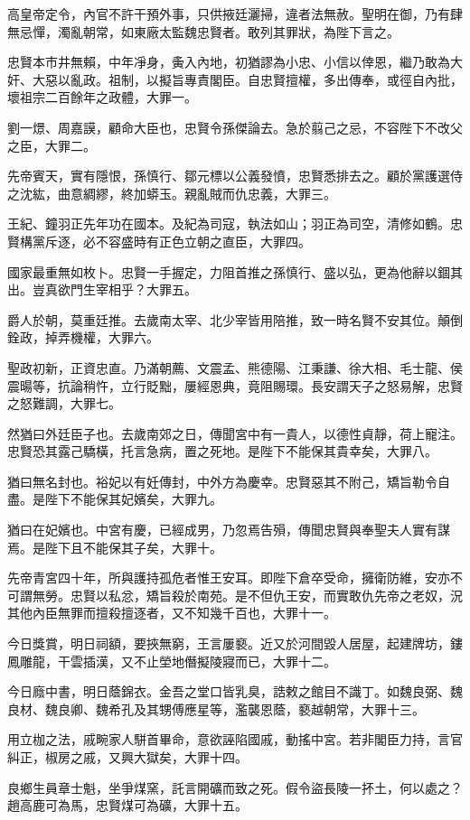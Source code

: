 \begin{pinyinscope}
高皇帝定令，內官不許干預外事，只供掖廷灑掃，違者法無赦。聖明在御，乃有肆無忌憚，濁亂朝常，如東廠太監魏忠賢者。敢列其罪狀，為陛下言之。

忠賢本市井無賴，中年凈身，夤入內地，初猶謬為小忠、小信以倖恩，繼乃敢為大奸、大惡以亂政。祖制，以擬旨專責閣臣。自忠賢擅權，多出傳奉，或徑自內批，壞祖宗二百餘年之政體，大罪一。

劉一燝、周嘉謨，顧命大臣也，忠賢令孫傑論去。急於翦己之忌，不容陛下不改父之臣，大罪二。

先帝賓天，實有隱恨，孫慎行、鄒元標以公義發憤，忠賢悉排去之。顧於黨護選侍之沈紘，曲意綢繆，終加蟒玉。親亂賊而仇忠義，大罪三。

王紀、鐘羽正先年功在國本。及紀為司寇，執法如山；羽正為司空，清修如鶴。忠賢構黨斥逐，必不容盛時有正色立朝之直臣，大罪四。

國家最重無如枚卜。忠賢一手握定，力阻首推之孫慎行、盛以弘，更為他辭以錮其出。豈真欲門生宰相乎？大罪五。

爵人於朝，莫重廷推。去歲南太宰、北少宰皆用陪推，致一時名賢不安其位。顛倒銓政，掉弄機權，大罪六。

聖政初新，正資忠直。乃滿朝薦、文震孟、熊德陽、江秉謙、徐大相、毛士龍、侯震暘等，抗論稍忤，立行貶黜，屢經恩典，竟阻賜環。長安謂天子之怒易解，忠賢之怒難調，大罪七。

然猶曰外廷臣子也。去歲南郊之日，傳聞宮中有一貴人，以德性貞靜，荷上寵注。忠賢恐其露己驕橫，托言急病，置之死地。是陛下不能保其貴幸矣，大罪八。

猶曰無名封也。裕妃以有妊傳封，中外方為慶幸。忠賢惡其不附己，矯旨勒令自盡。是陛下不能保其妃嬪矣，大罪九。

猶曰在妃嬪也。中宮有慶，已經成男，乃忽焉告殞，傳聞忠賢與奉聖夫人實有謀焉。是陛下且不能保其子矣，大罪十。

先帝青宮四十年，所與護持孤危者惟王安耳。即陛下倉卒受命，擁衛防維，安亦不可謂無勞。忠賢以私忿，矯旨殺於南苑。是不但仇王安，而實敢仇先帝之老奴，況其他內臣無罪而擅殺擅逐者，又不知幾千百也，大罪十一。

今日獎賞，明日祠額，要挾無窮，王言屢褻。近又於河間毀人居屋，起建牌坊，鏤鳳雕龍，干雲插漢，又不止塋地僭擬陵寢而已，大罪十二。

今日廕中書，明日蔭錦衣。金吾之堂口皆乳臭，誥敕之館目不識丁。如魏良弼、魏良材、魏良卿、魏希孔及其甥傅應星等，濫襲恩蔭，褻越朝常，大罪十三。

用立枷之法，戚畹家人駢首畢命，意欲誣陷國戚，動搖中宮。若非閣臣力持，言官糾正，椒房之戚，又興大獄矣，大罪十四。

良鄉生員章士魁，坐爭煤窯，託言開礦而致之死。假令盜長陵一抔土，何以處之？趙高鹿可為馬，忠賢煤可為礦，大罪十五。


\end{pinyinscope}
